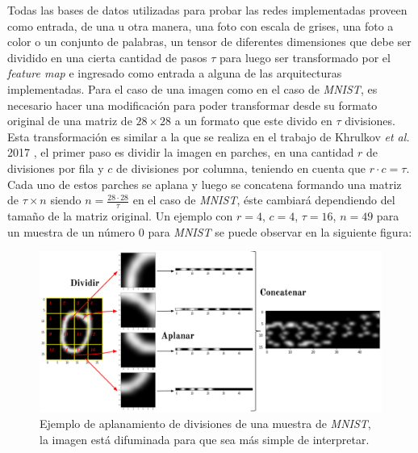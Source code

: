 \documentclass[spanish]{article}
\theoremstyle{definition}
\theoremstyle{remark}
\numberwithin{equation}{section}
\numberwithin{equation}{section} %
\begin{document}
Todas las bases de datos utilizadas para probar las redes implementadas proveen como entrada, de una u otra manera, una foto con escala de grises, una foto a color o un conjunto de palabras, un tensor de diferentes dimensiones que debe ser dividido en una cierta cantidad de pasos $\tau$ para luego ser transformado por el \textit{feature map} e ingresado como entrada a alguna de las arquitecturas implementadas.  Para el caso de una imagen como en el caso de \textit{MNIST}, es necesario hacer una modificación para poder transformar desde su formato original de una matriz de $28\times28$ a un formato que este divido en $\tau$ divisiones. Esta transformación es similar a la que se realiza en el trabajo de Khrulkov \textit{et al.} 2017 \cite{khrulkov2017expressive}, el primer paso es dividir la imagen en parches, en una cantidad $r$ de divisiones por fila y $c$ de divisiones por columna, teniendo en cuenta que $r \cdot c=\tau$. Cada uno de estos parches se aplana y luego se concatena formando una matriz de $\tau \times n$ siendo $n = \frac{28 \cdot 28}{\tau}$ en el caso de \textit{MNIST}, éste cambiará dependiendo del tamaño de la matriz original. Un ejemplo con $r=4$, $c=4$, $\tau=16$, $n=49$ para un muestra de un número $0$ para \textit{MNIST} se puede observar en la siguiente figura:
\begin{figure}[H]
\centering
\includegraphics[width=15cm]{img/ejemplo_flat_division_tensor.png}
\caption[Ejemplo de aplanamiento de divisiones de una muestra de \textit{MNIST}]{\footnotesize{ Ejemplo de aplanamiento de divisiones de una muestra de \textit{MNIST}, la imagen está difuminada para que sea más simple de interpretar. }}
\label{fig:flat_division_mnist}
\end{figure}
\end{document}
